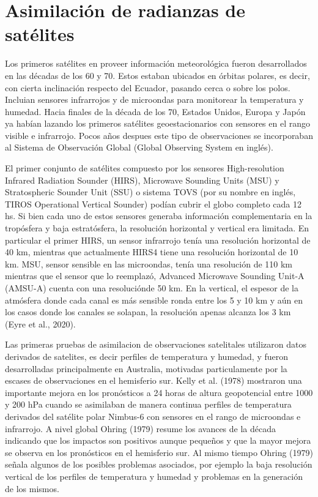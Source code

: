 \documentclass[12pt,oneside,a4paper]{reedthesis}
\begin{document}
\hypertarget{asim-rad}{%
\section{Asimilación de radianzas de satélites}\label{asim-rad}}

Los primeros satélites en proveer información meteorológica fueron desarrollados en las décadas de los 60 y 70. Estos estaban ubicados en órbitas polares, es decir, con cierta inclinación respecto del Ecuador, pasando cerca o sobre los polos. Incluian sensores infrarrojos y de microondas para monitorear la temperatura y humedad. Hacia finales de la década de los 70, Estados Unidos, Europa y Japón ya habían lazando los primeros satélites geoestacionarios con sensores en el rango visible e infrarrojo. Pocos años despues este tipo de observaciones se incorporaban al Sistema de Observación Global (Global Observing System en inglés).

El primer conjunto de satélites compuesto por los sensores High-resolution Infrared Radiation Sounder (HIRS), Microwave Sounding Units (MSU) y Stratospheric Sounder Unit (SSU) o sistema TOVS (por su nombre en inglés, TIROS Operational Vertical Sounder) podían cubrir el globo completo cada 12 hs. Si bien cada uno de estos sensores generaba información complementaria en la tropósfera y baja estratósfera, la resolución horizontal y vertical era limitada. En particular el primer HIRS, un sensor infrarrojo tenía una resolución horizontal de 40 km, mientras que actualmente HIRS4 tiene una resolución horizontal de 10 km. MSU, sensor sensible en las microondas, tenía una resolución de 110 km mientras que el sensor que lo reemplazó, Advanced Microwave Sounding Unit-A (AMSU-A) cuenta con una resoluciónde 50 km. En la vertical, el espesor de la atmósfera donde cada canal es más sensible ronda entre los 5 y 10 km y aún en los casos donde los canales se solapan, la resolución apenas alcanza los 3 km (Eyre et al., 2020).

Las primeras pruebas de asimilacion de observaciones satelitales utilizaron datos derivados de satelites, es decir perfiles de temperatura y humedad, y fueron desarrolladas principalmente en Australia, motivadas particulamente por la escases de observaciones en el hemisferio sur. Kelly et al. (1978) mostraron una importante mejora en los pronósticos a 24 horas de altura geopotencial entre 1000 y 200 hPa cuando se asimilaban de manera continua perfiles de temperatura derivados del satélite polar Nimbus-6 con sensores en el rango de microondas e infrarrojo. A nivel global Ohring (1979) resume los avances de la década indicando que los impactos son positivos aunque pequeños y que la mayor mejora se observa en los pronósticos en el hemisferio sur. Al mismo tiempo Ohring (1979) señala algunos de los posibles problemas asociados, por ejemplo la baja resolución vertical de los perfiles de temperatura y humedad y problemas en la generación de los mismos.
\end{document}
